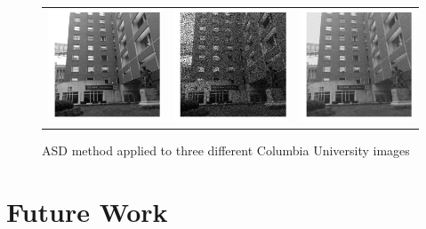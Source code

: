 \documentclass[12pt]{article}
\begin{document}
\begin{figure}[H]
{\begin{tabular}{ccc}
\includegraphics[width=65mm]{figures/columbia7.png}
&
\includegraphics[width=65mm]{figures/columbia8.png}
&
\includegraphics[width=65mm]{figures/columbia9.png}
\\
\end{tabular}

}

\caption{ASD method applied to three different Columbia University images}
\end{figure}

\newpage



\section{Future Work}
\end{document}
